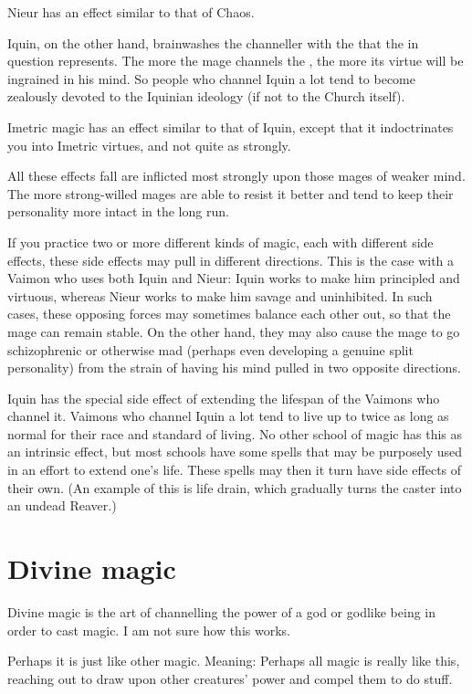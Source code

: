 Nieur has an effect similar to that of Chaos. 

Iquin, on the other hand, brainwashes the channeller with the  that the \Sephirah{} in question represents. The more the mage channels the \Sephirah{}, the more its virtue will be ingrained in his mind. So people who channel Iquin a lot tend to become zealously devoted to the Iquinian ideology (if not to the Church itself). 

Imetric magic has an effect similar to that of Iquin, except that it indoctrinates you into Imetric virtues, and not quite as strongly. 

All these effects fall are inflicted most strongly upon those mages of weaker mind. The more strong-willed mages are able to resist it better and tend to keep their personality more intact in the long run. 

If you practice two or more different kinds of magic, each with different side effects, these side effects may pull in different directions. This is the case with a Vaimon who uses both Iquin and Nieur: Iquin works to make him principled and virtuous, whereas Nieur works to make him savage and uninhibited. In such cases, these opposing forces may sometimes balance each other out, so that the mage can remain stable. On the other hand, they may also cause the mage to go schizophrenic or otherwise mad (perhaps even developing a genuine split personality) from the strain of having his mind pulled in two opposite directions. 

Iquin has the special side effect of extending the lifespan of the Vaimons who channel it. Vaimons who channel Iquin a lot tend to live up to twice as long as normal for their race and standard of living. No other school of magic has this as an intrinsic effect, but most schools have some spells that may be purposely used in an effort to extend one's life. These spells may then it turn have side effects of their own. (An example of this is life drain, which gradually turns the caster into an undead Reaver.) 



\section{Divine magic}
Divine magic is the art of channelling the power of a god or godlike being in order to cast magic. I am not sure how this works. 

Perhaps it is just like other magic. Meaning: Perhaps all magic is really like this, reaching out to draw upon other creatures' power and compel them to do stuff. 

